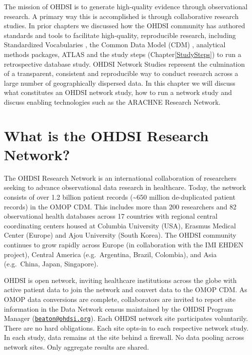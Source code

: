 \documentclass[11pt]{book}
\theoremstyle{definition}
\theoremstyle{definition}
\theoremstyle{definition}
\theoremstyle{remark}
\begin{document}
The mission of OHDSI is to generate high-quality evidence through observational research. A primary way this is accomplished is through collaborative research studies. In prior chapters we discussed how the OHDSI community has authored standards and tools to facilitate high-quality, reproducible research, including Standardized Vocabularies , the Common Data Model (CDM) , analytical methods packages, ATLAS and the study steps (Chapter\ref{StudySteps}) to run a retrospective database study. OHDSI Network Studies represent the culmination of a transparent, consistent and reproducible way to conduct research across a large number of geographically dispersed data. In this chapter we will discuss what constitutes an OHDSI network study, how to run a network study and discuss enabling technologies such as the ARACHNE Research Network.

\hypertarget{what-is-the-ohdsi-research-network}{%
\section{What is the OHDSI Research Network?}\label{what-is-the-ohdsi-research-network}}

The OHDSI Research Network is an international collaboration of researchers seeking to advance observational data research in healthcare. Today, the network consists of over 1.2 billion patient records (\textasciitilde650 million de-duplicated patient records) in the OMOP CDM. This includes more than 200 researchers and 82 observational health databases across 17 countries with regional central coordinating centers housed at Columbia University (USA), Erasmus Medical Center (Europe) and Ajou University (South Korea). The OHDSI community continues to grow rapidly across Europe (in collaboration with the IMI EHDEN project), Central America (e.g.~Argentina, Brazil, Colombia), and Asia (e.g.~China, Japan, Singapore).

OHDSI is open network, inviting healthcare institutions across the globe with active patient data to join the network and convert data to the OMOP CDM. As OMOP data conversions are complete, collaborators are invited to report site information in the Data Network census maintained by the OHDSI Program Manager (\href{mailto:beaton@ohdsi.org}{\nolinkurl{beaton@ohdsi.org}}). Each OHDSI network site participates voluntarily. There are no hard obligations. Each site opts-in to each respective network study. In each study, data remains at the site behind a firewall. No data pooling across network sites. Only aggregate results are shared.
\end{document}
